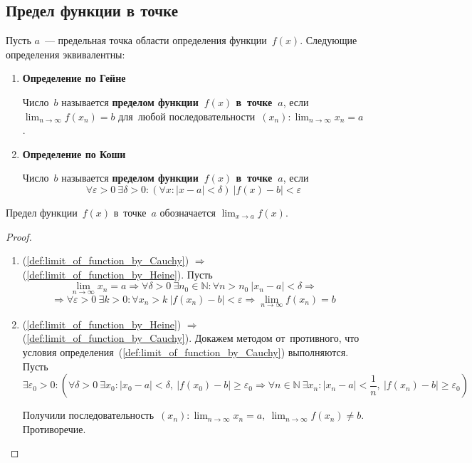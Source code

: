 \subsection{Предел функции в точке}
Пусть $a$~--- предельная точка области определения функции~$f(x)$.
Следующие определения эквивалентны:
\begin{enumerate}
	\item\label{def:limit_of_function_by_Heine}\textbf{Определение по Гейне}
	
	Число~$b$ называется \textbf{пределом функции~$f(x)$ в~точке~$a$}, если $\displaystyle \lim_{n \to \infty} f(x_n) = b$ для~любой последовательности~$\displaystyle (x_n): \lim_{n \to \infty} x_n = a$.
	
	\item\label{def:limit_of_function_by_Cauchy}\textbf{Определение по Коши}
	
	Число~$b$ называется \textbf{пределом функции~$f(x)$ в~точке~$a$}, если
	\begin{equation*}
	\forall \varepsilon > 0 \ \exists \delta > 0 \colon (\forall x \colon |x - a| < \delta) \ |f(x) - b| < \varepsilon
	\end{equation*}
\end{enumerate}

Предел функции~$f(x)$ в~точке~$a$ обозначается $\displaystyle \lim_{x \to a} f(x)$.
\begin{proof}
\begin{enumerate}
	\item (\ref{def:limit_of_function_by_Cauchy}) $\Rightarrow$ (\ref{def:limit_of_function_by_Heine}).
	Пусть 
	\begin{equation*}
	\lim_{n \to \infty} x_n = a \Rightarrow
	\forall \delta > 0 \ \exists n_0 \in \mathbb N \colon \forall n > n_0 \ |x_n - a| < \delta \Rightarrow
	\end{equation*}
	\begin{equation*}
	\Rightarrow \forall \varepsilon > 0 \ \exists k > 0 \colon \forall x_n > k \ |f(x_n) - b| < \varepsilon \Rightarrow
	\lim_{n \to \infty} f(x_n) = b
	\end{equation*}
	
	\item (\ref{def:limit_of_function_by_Heine}) $\Rightarrow$ (\ref{def:limit_of_function_by_Cauchy}).
	Докажем методом от~противного, что условия определения~(\ref{def:limit_of_function_by_Cauchy}) выполняются.
	Пусть 
	\begin{equation*}
	\exists \varepsilon_0 > 0 \colon (\forall \delta > 0 \ \exists x_0 \colon |x_0 - a| < \delta, \ |f(x_0) - b| \geqslant \varepsilon_0 \Rightarrow
	\forall n \in \mathbb N \ \exists x_n \colon |x_n - a| < \frac1n, \ |f(x_n) - b| \geqslant \varepsilon_0)
	\end{equation*}
	
	Получили последовательность~$\displaystyle (x_n) \colon \lim_{n \to \infty} x_n = a, \ \lim_{n \to \infty} f(x_n) \neq b$.
	Противоречие.
\end{enumerate}
\end{proof}

